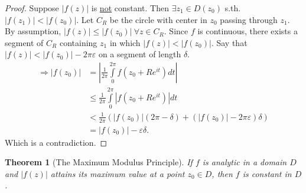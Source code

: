 \documentclass[12pt, a4paper]{article}
\theoremstyle{plain}
\newtheorem{thm}{Theorem} %
\theoremstyle{definition}
\begin{document}
			\begin{proof}
				Suppose $|f(z)|$ is \underline{not} constant. Then $\exists z_1\in D(z_0)$ s.th. $|f(z_1)|<|f(z_0)|$. Let $C_R$ be the circle with center in $z_0$ passing through $z_1$. By assumption, $|f(z)|\le |f(z_0)|\:\forall z\in C_R$. Since $f$ is continuous, there exists a segment of $C_R$ containing $z_1$ in which $|f(z)|<|f(z_0)|$. Say that $|f(z)|<|f(z_0)|-2\pi \varepsilon$ on a segment of length $\delta$.
				\begin{align*}
					\Rightarrow |f(z_0)| &= \left|\frac{1}{2\pi}\int\limits_{0}^{2\pi}f(z_0+Re^{it})dt\right|
					\tag*{By the mean-value-property}\\ &\le
					\frac{1}{2\pi}\int\limits_{0}^{2\pi}|f(z_0+Re^{it})|dt\\ &< 
					\frac{1}{2\pi}\left(|f(z_0)|(2\pi- \delta)+(|f(z_0)|-2\pi \varepsilon)\delta\right)\\ &=
					|f(z_0)|-\varepsilon \delta.
				\end{align*}
				Which is a contradiction.
			\end{proof}
			\begin{thm}[The Maximum Modulus Principle]
			\label{thm:maximum_modulus_principle}
				If $f$ is analytic in a domain $D$ and $|f(z)|$ attains its maximum value at a point $z_0\in D$, then $f$ is constant in $D$.
			\end{thm}
\end{document}
